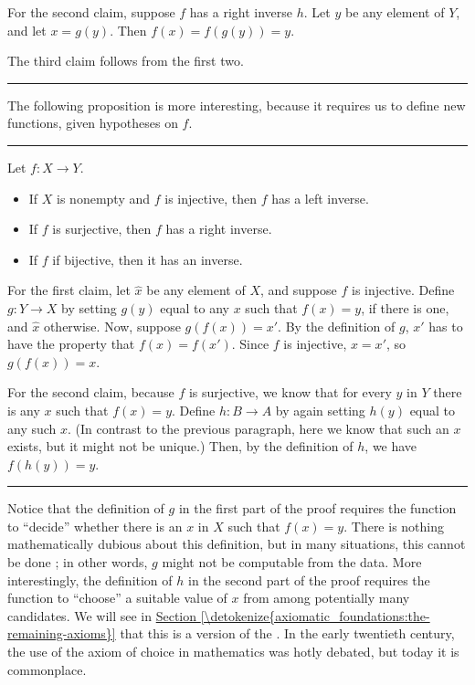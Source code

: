 \documentclass[letterpaper,10pt,english]{sphinxmanual}
\begin{document}
\sphinxAtStartPar
For the second claim, suppose \(f\) has a right inverse \(h\). Let \(y\) be any element of \(Y\), and let \(x = g(y)\). Then \(f(x) = f(g(y)) = y\).

\sphinxAtStartPar
The third claim follows from the first two.


\bigskip\hrule\bigskip


\sphinxAtStartPar
The following proposition is more interesting, because it requires us to define new functions, given hypotheses on \(f\).


\bigskip\hrule\bigskip


\sphinxAtStartPar
{} Let \(f : X \to Y\).
\begin{itemize}
\item {} 
\sphinxAtStartPar
If \(X\) is nonempty and \(f\) is injective, then \(f\) has a left inverse.

\item {} 
\sphinxAtStartPar
If \(f\) is surjective, then \(f\) has a right inverse.

\item {} 
\sphinxAtStartPar
If \(f\) if bijective, then it has an inverse.

\end{itemize}

\sphinxAtStartPar
{} For the first claim, let \(\hat x\) be any element of \(X\), and suppose \(f\) is injective. Define \(g : Y \to X\) by setting \(g(y)\) equal to any \(x\) such that \(f(x) = y\), if there is one, and \(\hat x\) otherwise. Now, suppose \(g(f(x)) = x'\). By the definition of \(g\), \(x'\) has to have the property that \(f(x) = f(x')\). Since \(f\) is injective, \(x = x'\), so \(g(f(x)) = x\).

\sphinxAtStartPar
For the second claim, because \(f\) is surjective, we know that for every \(y\) in \(Y\) there is any \(x\) such that \(f(x) = y\). Define \(h : B \to A\) by again setting \(h(y)\) equal to any such \(x\). (In contrast to the previous paragraph, here we know that such an \(x\) exists, but it might not be unique.) Then, by the definition of \(h\), we have \(f(h(y)) = y\).


\bigskip\hrule\bigskip


\sphinxAtStartPar
Notice that the definition of \(g\) in the first part of the proof requires the function to “decide” whether there is an \(x\) in \(X\) such that \(f(x) = y\). There is nothing mathematically dubious about this definition, but in many situations, this cannot be done ; in other words, \(g\) might not be computable from the data. More interestingly, the definition of \(h\) in the second part of the proof requires the function to “choose” a suitable value of \(x\) from among potentially many candidates. We will see in \hyperref[\detokenize{axiomatic_foundations:the-remaining-axioms}]{Section \ref{\detokenize{axiomatic_foundations:the-remaining-axioms}}} that this is a version of the . In the early twentieth century, the use of the axiom of choice in mathematics was hotly debated, but today it is commonplace.
\end{document}
